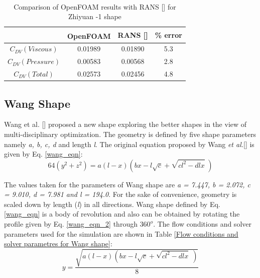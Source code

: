 \begin{table}[H]
	\centering
	\caption{\label{Zhiyuan -1 Cdv} Comparison of OpenFOAM\textsuperscript{\textregistered} results with RANS [] for Zhiyuan -1 shape}
	\begin{tabular}{cccc}
		\hline \hline
		& OpenFOAM\textsuperscript{\textregistered} & RANS [\citenum{Suman2011}] & \% error    \\ \hline \hline
		
		$ C_{DV} (Viscous)$ & 0.01989 & 0.01890 & 5.3    \\  
		$ C_{DV} (Pressure) $ & 0.00583 & 0.00568 & 2.8    \\
		$ C_{DV} (Total) $ & 0.02573 & 0.02456 & 4.8    \\  \hline
	\end{tabular}
\end{table}


\subsection{Wang Shape \cite{Wang2009}}
Wang et al. [] proposed a new shape exploring the better shapes in the view of multi-disciplinary optimization. The geometry is defined by five shape parameters namely \textit{a, b, c, d} and length \textit{l}. The original equation proposed by Wang \textit{et al.}[] is given by Eq. \ref{wang_eqn}:
\begin{equation}
64(y^{2} + z^{2}) = a(l-x)\left( bx - l \sqrt{c} + \sqrt{c l^{2} - dlx} \; \right) 
\label{wang_eqn}
\end{equation}

The values taken for the parameters of Wang shape are \textit{a = 7.447, b = 2.072, c = 9.010, d = 7.981 and l = 194.0}. For the sake of convenience, geometry is scaled down by length (\textit{l}) in all directions. Wang shape defined by Eq. \ref{wang_eqn} is a body of revolution and also can be obtained by rotating the profile given by Eq. \ref{wang_eqn_2} through $ 360^{o} $. The flow conditions and solver parameters used for the simulation are shown in Table \ref{Flow conditions and solver parametres for Wang shape}:
\begin{equation}
y = \dfrac{\sqrt{a(l-x)\left( bx - l \sqrt{c} + \sqrt{c l^{2} - dlx} \; \right)}}{8} 
\label{wang_eqn_2}
\end{equation}

